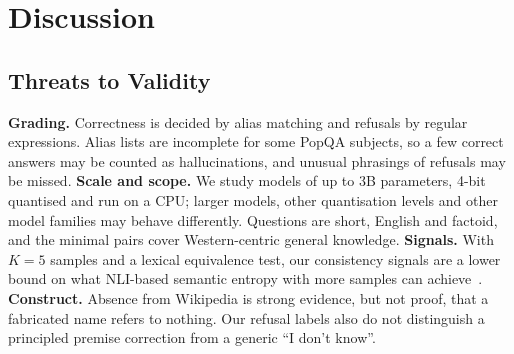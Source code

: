\section{Discussion}
\label{sec:discussion}

\subsection{Threats to Validity}
\label{sec:validity}
\textbf{Grading.} Correctness is decided by alias matching and refusals by regular expressions. Alias lists are incomplete for some PopQA subjects, so a few correct answers may be counted as hallucinations, and unusual phrasings of refusals may be missed. %
\textbf{Scale and scope.} We study models of up to 3B parameters, 4-bit quantised and run on a CPU; larger models, other quantisation levels and other model families may behave differently. Questions are short, English and factoid, and the minimal pairs cover Western-centric general knowledge. \textbf{Signals.} With $K{=}5$ samples and a lexical equivalence test, our consistency signals are a lower bound on what NLI-based semantic entropy with more samples can achieve~\cite{farquhar2024nature}. \textbf{Construct.} Absence from Wikipedia is strong evidence, but not proof, that a fabricated name refers to nothing. Our refusal labels also do not distinguish a principled premise correction from a generic ``I don't know''.
